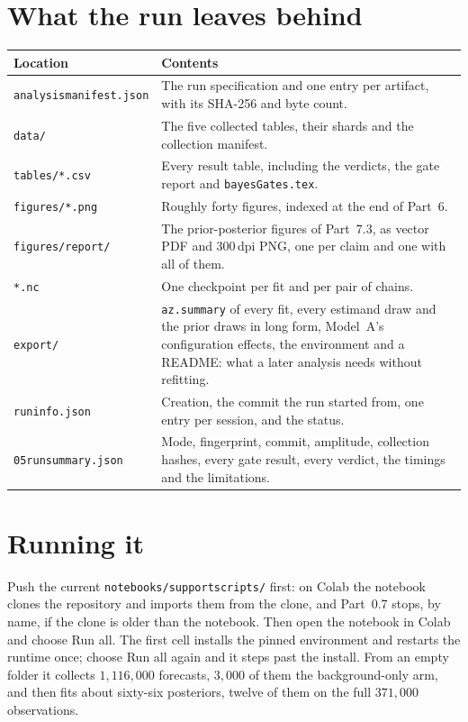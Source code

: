 \documentclass[10pt,a4paper]{article}
\newcommand{\code}[1]{\texttt{\UseBreakableUnderscores #1}}
\newcommand{\UseBreakableUnderscores}{\def\_{\textunderscore\allowbreak}}
\begin{document}
\section{What the run leaves behind}
\begin{center}\small
\begin{tabularx}{\textwidth}{@{}L{3.6cm}Y@{}}
\toprule
\textbf{Location} & \textbf{Contents}\\
\midrule
\code{analysis\_manifest.json} & The run specification and one entry per artifact, with its SHA-256 and byte count.\\
\code{data/} & The five collected tables, their shards and the collection manifest.\\
\code{tables/*.csv} & Every result table, including the verdicts, the gate report and \code{bayesGates.tex}.\\
\code{figures/*.png} & Roughly forty figures, indexed at the end of Part~6.\\
\code{figures/report/} & The prior-posterior figures of Part~7.3, as vector PDF and 300\,dpi PNG, one per claim and one with all of them.\\
\code{*.nc} & One checkpoint per fit and per pair of chains.\\
\code{export/} & \code{az.summary} of every fit, every estimand draw and the prior draws in long form, Model~A's configuration effects, the environment and a README: what a later analysis needs without refitting.\\
\code{run\_info.json} & Creation, the commit the run started from, one entry per session, and the status.\\
\code{05\_run\_summary.json} & Mode, fingerprint, commit, amplitude, collection hashes, every gate result, every verdict, the timings and the limitations.\\
\bottomrule
\end{tabularx}
\end{center}

\section{Running it}
Push the current \code{notebooks/support\_scripts/} first: on Colab the notebook clones the repository and imports them from the clone, and Part~0.7 stops, by name, if the clone is older than the notebook. Then open the notebook in Colab and choose Run all. The first cell installs the pinned environment and restarts the runtime once; choose Run all again and it steps past the install. From an empty folder it collects $1{,}116{,}000$ forecasts, $3{,}000$ of them the background-only arm, and then fits about sixty-six posteriors, twelve of them on the full $371{,}000$ observations.
\end{document}
